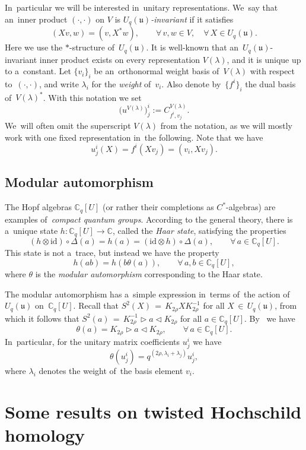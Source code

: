 \documentclass[pdftex]{sigma}
\numberwithin{equation}{section}
\newcommand{\Uqu}{U_q(\mathfrak{u})}
\newcommand{\CqU}{\mathbb{C}_q[U]}
\newcommand{\id}{\mathrm{id}}
\newcommand{\bbC}{\mathbb{C}}
\begin{document}
In~particular we will be interested in~unitary representations.
We~say that an~inner product $(\cdot, \cdot)$ on $V$ is \emph{$\Uqu$-invariant} if it satisfies
\[
(X v, w) = (v, X^* w), \qquad \forall\, v, w \in V, \quad \forall\, X \in \Uqu.
\]
Here we use the $*$-structure of~$\Uqu$.
It is well-known that an~$\Uqu$-invariant inner product exists on every representation $V(\lambda)$, and it is unique up to a~constant.
Let $\{v_i\}_i$ be an~orthonormal weight basis of~$V(\lambda)$ with respect to~$(\cdot, \cdot)$, and write $\lambda_i$ for the \emph{weight} of~$v_i$.
Also denote by~$\{f^i\}_i$ the dual basis of~$V(\lambda)^*$.
With this notation we set
\[
\big(u^{V(\lambda)}\big)^i_j := C^{V(\lambda)}_{f^i, v_j}.
\]
We~will often omit the superscript $V(\lambda)$ from the notation, as we will mostly work with one fixed representation in~the following.
Note that we have
\[
u^i_j(X) = f^i(X v_j) = (v_i, X v_j).
\]

\subsection{Modular automorphism}

The Hopf algebras $\CqU$ (or rather their completions as $C^*$-algebras) are examples of~\emph{compact quantum groups}.
According to the general theory, there is a~unique state $h\colon \CqU \to \bbC$, called the \emph{Haar state}, satisfying the properties
\[
(h \otimes \id) \circ \Delta(a) = h(a) = (\id \otimes h) \circ \Delta(a), \qquad \forall\, a \in \CqU.
\]
This state is not a~trace, but instead we have the property
\[
h(a b) = h(b \theta(a)), \qquad \forall \, a, b \in \CqU,
\]
where $\theta$ is the \emph{modular automorphism} corresponding to the Haar state.

The modular automorphism has a~simple expression in~terms of~the action of~$\Uqu$ on~$\CqU$.
Recall that $S^2(X)\, {=}\, K_{2 \rho} X K_{2 \rho}^{-1}$ for all $X \,{\in}\, \Uqu$, from which it follows that $S^2(a)\,{ =}\,K_{2 \rho}^{-1} \triangleright a\triangleleft K_{2 \rho}$ for all $a \in \CqU$.
By~\cite[Chapter 11, Proposition~34]{klsc} we have
\[
\theta(a) = K_{2 \rho} \triangleright a \triangleleft K_{2 \rho}, \qquad \forall\, a \in \CqU.
\]
In~particular, for the unitary matrix coefficients $u^i_j$ we have
\[
\theta(u^i_j) = q^{(2 \rho, \lambda_i + \lambda_j)} u^i_j,
\]
where $\lambda_i$ denotes the weight of~the basis element $v_i$.

\section{Some results on twisted Hoch\-schild homology}
\label{sec:hochschild}
\end{document}
